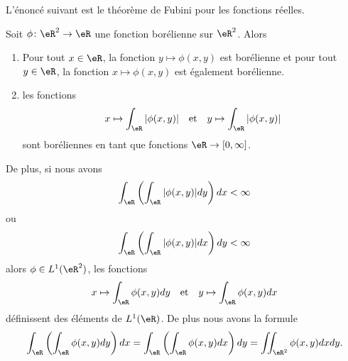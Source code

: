 L'énoncé suivant est le théorème de Fubini pour les fonctions réelles.
\begin{theorem}     \label{ThoTKZKwP}
    Soit \( \phi\colon \eR^2\to \eR\) une fonction borélienne sur \( \eR^2\). Alors
    \begin{enumerate}
        \item
            Pour tout \( x\in \eR\), la fonction \( y\mapsto \phi(x,y)\) est borélienne et pour tout \( y\in \eR\), la fonction \( x\mapsto \phi(x,y)\) est également borélienne.
        \item
            les fonctions
            \begin{equation}
                \begin{aligned}[]
                    x\mapsto\int_{\eR}| \phi(x,y) |&&\text{et}&&y\mapsto\int_{\eR}| \phi(x,y) |
                \end{aligned}
            \end{equation}
            sont boréliennes en tant que fonctions \( \eR\to \mathopen[ 0 , \infty \mathclose]\).
    \end{enumerate}
    
    De plus, si nous avons
    \begin{equation}
        \int_{\eR}\left( \int_{\eR}| \phi(x,y) |dy \right)dx<\infty
    \end{equation}
    ou
    \begin{equation}
        \int_{\eR}\left( \int_{\eR}| \phi(x,y) |dx \right)dy<\infty
    \end{equation}
    alors \( \phi\in L^1(\eR^2)\), les fonctions
    \begin{equation}
        \begin{aligned}[]
            x\mapsto\int_{\eR}\phi(x,y)dy&&\text{et}&&y\mapsto\int_{\eR}\phi(x,y)dx
        \end{aligned}
    \end{equation}
    définissent des éléments de \( L^1(\eR)\). De plus nous avons la formule
    \begin{equation}
        \int_{\eR}\left( \int_{\eR}\phi(x,y)dy \right)dx=\int_{\eR}\left( \int_{\eR}\phi(x,y)dx \right)dy=\iint_{\eR^2}\phi(x,y)dxdy.
    \end{equation}
\end{theorem}

